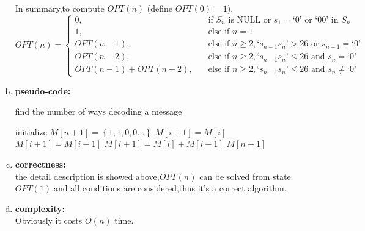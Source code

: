 \begin{enumerate}[a).]
\begin{enumerate}[i.]
	\end{enumerate}	
In summary,to compute $OPT(n)$ (define $OPT(0)=1$),
\[
	OPT(n) = \left\lbrace \begin{split} 
	0,	\quad&\text{if }S_n \text{ is NULL or } s_1 = \text{`}0\text{'} 
	\text{ or `00' in } S_n \\
	1, \quad&\text{else if } n = 1  \\
	OPT(n-1),\quad	&\text{else if } n \geq 2 ,\text{`}s_{n-1}s_{n}\text{'} > 26 
	\text{ or } s_{n-1} = \text{`}0\text{'} \\
	OPT(n-2),\quad &\text{else if } n \geq 2,\text{`}s_{n-1}s_{n}\text{'} \leq 26 
		\text{ and } s_n = \text{`}0\text{'} \\
	OPT(n-1) + OPT(n-2), \quad&\text{else if } n \geq 2,\text{`}s_{n-1}s_{n}\text{'} \leq 26 
	\text{ and } s_n \neq \text{`}0\text{'}
	\end{split} \right . 
\]	 
	
	\item \textbf{pseudo-code:}
	\begin{algorithm}[H]
		\caption{find the number of ways decoding a message}
		\begin{algorithmic}[1]
			\Require{}	
					\State {}
				\EndIf
					\State {}
				\EndIf 
				\State initialize $M[n+1] = \left\lbrace 1,1,0,0...\right\rbrace $
						  \State {}
						 \EndIf
						 \State $M[i+1] = M[i]$
					 \Else
							\State $M[i+1] = M[i-1]$
						\Else
							\State $M[i+1] = M[i] + M[i-1]$
						\EndIf 	 
					 \EndIf
					\EndFor
			\State \Return $M[n+1]$
		    \EndFunction 			
		\end{algorithmic}
	\end{algorithm}
	
	\item \textbf{correctness:}\\
	the detail description is showed above,$OPT(n)$ can be solved 
	from state $OPT(1)$,and all conditions are considered,thus it's 
	a correct algorithm.
	\item \textbf{complexity:} \\
	Obviously it costs $O(n)$ time.
	
	
	
	
	
	
\end{enumerate}